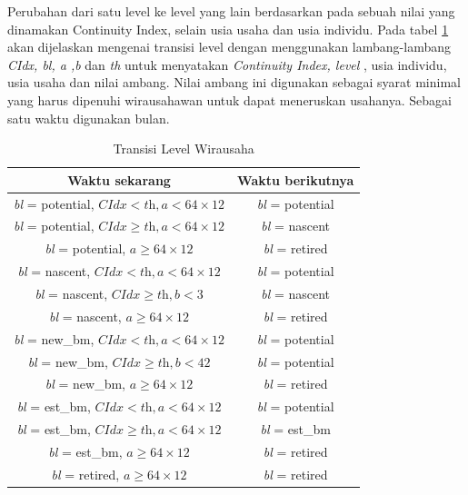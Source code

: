 \documentclass[a4paper,twoside]{article}
\begin{document}
\begin{enumerate}
\begin{enumerate}
Perubahan dari satu level ke level yang lain berdasarkan pada sebuah nilai yang dinamakan Continuity Index, selain usia usaha dan usia individu. Pada tabel \ref{tabelLW} akan dijelaskan mengenai transisi level dengan menggunakan lambang-lambang \textit{CIdx, bl, a ,b} dan \textit{th} untuk menyatakan \textit{Continuity Index, level} , usia individu, usia usaha dan nilai ambang. Nilai ambang ini digunakan sebagai syarat minimal yang harus dipenuhi wirausahawan untuk dapat meneruskan usahanya. Sebagai satu waktu digunakan bulan.

\begin{table}[H]
\centering
\caption{Transisi Level Wirausaha}
\begin{tabular}{|c|c|}
\hline
Waktu sekarang & Waktu berikutnya \\
\hline
\textit{bl} = potential, $ \textit{CIdx} < \textit{th}, \textit{a} < 64 \times 12$ & \textit{bl} = potential \\
\hline
\textit{bl} = potential, $\textit{CIdx} \geq \textit{th}, \textit{a} < 64 \times 12$ & \textit{bl} = nascent \\
\hline
\textit{bl} = potential, $\textit{a} \geq 64 \times 12$ & \textit{bl} = retired \\
\hline
\textit{bl} = nascent, $\textit{CIdx} < \textit{th}, \textit{a} <64 \times 12$ & \textit{bl} = potential \\
\hline
\textit{bl} = nascent, $\textit{CIdx} \geq \textit{th}, \textit{b} < 3$ & \textit{bl} = nascent \\
\hline
\textit{bl} = nascent, $\textit{a} \geq 64 \times 12$ & \textit{bl} = retired \\
\hline
\textit{bl} = new\_bm, $\textit{CIdx} < \textit{th}, \textit{a} < 64 \times 12$ & \textit{bl} = potential \\
\hline
\textit{bl} = new\_bm, $\textit{CIdx} \geq \textit{th}, \textit{b} < 42$ & \textit{bl} = potential \\
\hline
\textit{bl} = new\_bm, $\textit{a} \geq 64 \times 12$ & \textit{bl} = retired \\
\hline
\textit{bl} = est\_bm, $\textit{CIdx} < \textit{th}, \textit{a} < 64 \times 12$ & \textit{bl} = potential \\
\hline
\textit{bl} = est\_bm, $\textit{CIdx} \geq \textit{th}, \textit{a} < 64 \times 12$ & \textit{bl} = est\_bm \\
\hline
\textit{bl} = est\_bm, $\textit{a} \geq 64 \times 12$ & \textit{bl} = retired \\
\hline
\textit{bl} = retired, $\textit{a} \geq 64 \times 12$ & \textit{bl} = retired \\
\hline
\end{tabular}
\label{tabelLW}
\end{table}


\end{enumerate}
\end{enumerate}
\end{document}
